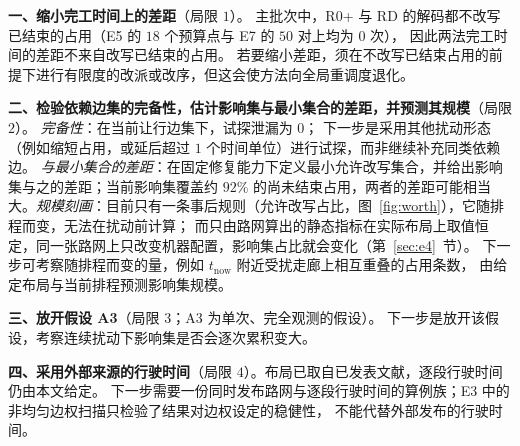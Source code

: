 \documentclass[manuscript,screen,review]{acmart}
\newcommand{\NPairs}{50}
\newcommand{\ClosureAliveFrac}{92\%}
\newcommand{\ProbeLeaks}{0}
\begin{document}
\textbf{一、缩小完工时间上的差距}（局限 \(1\)）。
主批次中，R0+ 与 RD 的解码都不改写已结束的占用（E5 的 \(18\) 个预算点与 E7 的 \(\NPairs\) 对上均为 \(0\) 次），
因此两法完工时间的差距不来自改写已结束的占用。
若要缩小差距，须在不改写已结束占用的前提下进行有限度的改派或改序，但这会使方法向全局重调度退化。

\textbf{二、检验依赖边集的完备性，估计影响集与最小集合的差距，并预测其规模}（局限 \(2\)）。
\emph{完备性}：在当前让行边集下，试探泄漏为 \ProbeLeaks；
下一步是采用其他扰动形态（例如缩短占用，或延后超过 \(1\) 个时间单位）进行试探，而非继续补充同类依赖边。
\emph{与最小集合的差距}：在固定修复能力下定义最小允许改写集合，并给出影响集与之的差距；当前影响集覆盖约
\(\ClosureAliveFrac\) 的尚未结束占用，两者的差距可能相当大。\emph{规模刻画}：目前只有一条事后规则（允许改写占比，图~\ref{fig:worth}），它随排程而变，无法在扰动前计算；
而只由路网算出的静态指标在实际布局上取值恒定，同一张路网上只改变机器配置，影响集占比就会变化（第~\ref{sec:e4}~节）。
下一步可考察随排程而变的量，例如 \(t_{\mathrm{now}}\) 附近受扰走廊上相互重叠的占用条数，
由给定布局与当前排程预测影响集规模。

\textbf{三、放开假设 A3}（局限 \(3\)；A3 为单次、完全观测的假设）。
下一步是放开该假设，考察连续扰动下影响集是否会逐次累积变大。

\textbf{四、采用外部来源的行驶时间}（局限 \(4\)）。布局已取自已发表文献，逐段行驶时间仍由本文给定。
下一步需要一份同时发布路网与逐段行驶时间的算例族；E3 中的非均匀边权扫描只检验了结果对边权设定的稳健性，
不能代替外部发布的行驶时间。



\end{document}
